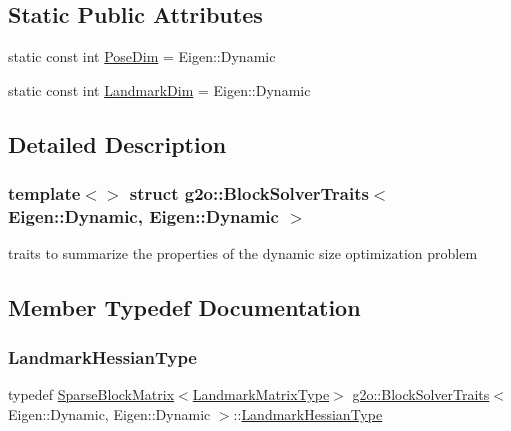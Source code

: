 \subsection*{Static Public Attributes}
\begin{DoxyCompactItemize}
\item 
static const int \mbox{\hyperlink{structg2o_1_1_block_solver_traits_3_01_eigen_1_1_dynamic_00_01_eigen_1_1_dynamic_01_4_a04a2cc2de80563b4b21f815150c3b0ec}{Pose\+Dim}} = Eigen\+::\+Dynamic
\item 
static const int \mbox{\hyperlink{structg2o_1_1_block_solver_traits_3_01_eigen_1_1_dynamic_00_01_eigen_1_1_dynamic_01_4_aa8f7b7c3fc1ce4a7d61e925e3067e196}{Landmark\+Dim}} = Eigen\+::\+Dynamic
\end{DoxyCompactItemize}


\subsection{Detailed Description}
\subsubsection*{template$<$$>$\newline
struct g2o\+::\+Block\+Solver\+Traits$<$ Eigen\+::\+Dynamic, Eigen\+::\+Dynamic $>$}

traits to summarize the properties of the dynamic size optimization problem 

\subsection{Member Typedef Documentation}
\mbox{\label{structg2o_1_1_block_solver_traits_3_01_eigen_1_1_dynamic_00_01_eigen_1_1_dynamic_01_4_a73a81a0aeabd1216ae3a8f5700666ac4}} 
\subsubsection{\texorpdfstring{Landmark\+Hessian\+Type}{LandmarkHessianType}}
{\footnotesize\ttfamily typedef \mbox{\hyperlink{classg2o_1_1_sparse_block_matrix}{Sparse\+Block\+Matrix}}$<$\mbox{\hyperlink{structg2o_1_1_block_solver_traits_3_01_eigen_1_1_dynamic_00_01_eigen_1_1_dynamic_01_4_a4409de5074b3458f33ba2015e2fa6891}{Landmark\+Matrix\+Type}}$>$ \mbox{\hyperlink{structg2o_1_1_block_solver_traits}{g2o\+::\+Block\+Solver\+Traits}}$<$ Eigen\+::\+Dynamic, Eigen\+::\+Dynamic $>$\+::\mbox{\hyperlink{structg2o_1_1_block_solver_traits_3_01_eigen_1_1_dynamic_00_01_eigen_1_1_dynamic_01_4_a73a81a0aeabd1216ae3a8f5700666ac4}{Landmark\+Hessian\+Type}}}

